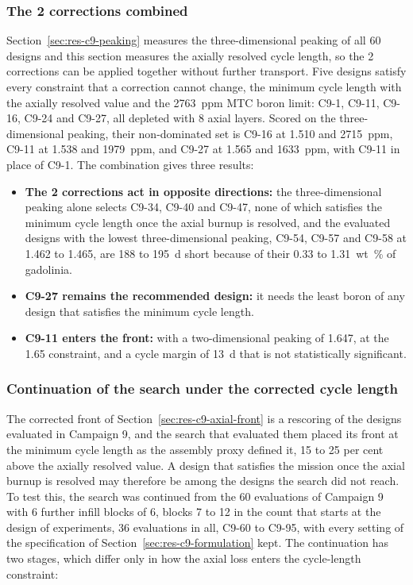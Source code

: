 \subsubsection{The 2 corrections combined}
\label{sec:res-c9-combined}
Section~\ref{sec:res-c9-peaking} measures the three-dimensional
peaking of all 60 designs and this section measures the axially
resolved cycle length, so the 2 corrections can be applied together
without further transport. Five designs satisfy every constraint that
a correction cannot change, the minimum cycle length with the axially
resolved value and the \SI{2763}{ppm} MTC boron limit: C9-1, C9-11,
C9-16, C9-24 and C9-27, all depleted with 8 axial layers. Scored on the
three-dimensional peaking, their non-dominated set is C9-16 at 1.510 and
\SI{2715}{ppm}, C9-11 at 1.538 and \SI{1979}{ppm}, and C9-27 at 1.565
and \SI{1633}{ppm}, with C9-11 in place of C9-1. The combination gives
three results:

\begin{itemize}
  \item \textbf{The 2 corrections act in opposite directions:} the
        three-dimensional peaking alone selects C9-34, C9-40 and C9-47,
        none of which satisfies the minimum cycle length once the axial
        burnup is resolved, and the evaluated designs with the lowest
        three-dimensional peaking, C9-54, C9-57 and C9-58 at 1.462 to
        1.465, are 188 to \SI{195}{d} short because of their 0.33 to
        \SI{1.31}{wt\%} of gadolinia.
  \item \textbf{C9-27 remains the recommended design:} it needs the
        least boron of any design that satisfies the minimum cycle
        length.
  \item \textbf{C9-11 enters the front:} with a two-dimensional peaking
        of 1.647, at the 1.65 constraint, and a cycle margin of
        \SI{13}{d} that is not statistically significant.
\end{itemize}

\subsubsection{Continuation of the search under the corrected cycle length}
\label{sec:res-c9-cont}
The corrected front of Section~\ref{sec:res-c9-axial-front} is a
rescoring of the designs evaluated in Campaign 9, and the search that
evaluated them placed its front at the minimum cycle length as the
assembly proxy defined it, 15 to 25 per cent above the axially resolved
value. A design that satisfies the mission once the axial burnup is
resolved may therefore be among the designs the search did not reach.
To test this, the search was continued from the 60 evaluations of
Campaign 9 with 6 further infill blocks of 6, blocks 7 to 12 in the
count that starts at the design of experiments, 36 evaluations in all,
C9-60 to C9-95, with every setting of the specification of
Section~\ref{sec:res-c9-formulation} kept. The continuation has two
stages, which differ only in how the axial loss enters the cycle-length
constraint:

